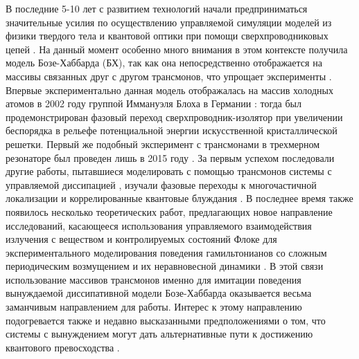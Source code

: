 \documentclass[14pt, a4paper]{extreport}
\numberwithin{equation}{section}
\begin{document}
В последние 5-10 лет с развитием технологий начали предприниматься значительные усилия по осуществлению управляемой симуляции моделей из физики твердого тела и квантовой оптики при помощи сверхпроводниковых цепей \cite{kjaergaard2020superconducting}. На данный момент особенно много внимания в этом контексте получила модель Бозе-Хаббарда (БХ), так как она непосредственно отображается на массивы связанных друг с другом трансмонов, что упрощает эксперименты \cite{orell2019probing,yanay2020two}. Впервые экспериментально данная модель отображалась на массив холодных атомов в 2002 году группой Иммануэля Блоха в Германии \cite{greiner2002quantum}: тогда был продемонстрирован фазовый переход сверхпроводник-изолятор при увеличении беспорядка в рельефе потенциальной энергии искусственной кристаллической решетки. Первый же подобный эксперимент с трансмонами в трехмерном резонаторе был проведен лишь в 2015 году \cite{hacohen2015cooling}. За первым успехом последовали другие работы, пытавшиеся моделировать с помощью трансмонов системы с управляемой диссипацией \cite{ma2019dissipatively}, изучали фазовые переходы к многочастичной локализации \cite{roushan2017spectroscopic,chiaro2019growth, collodo2019observation} и коррелированные квантовые блуждания \cite{Yan2019, Ye2019}. В последнее время также появилось несколько теоретических работ, предлагающих новое направление исследований, касающееся использования управляемого взаимодействия излучения с веществом и контролируемых состояний Флоке для экспериментального моделирования поведения гамильтонианов со сложным периодическим возмущением и их неравновесной динамики \cite{Goldman2014, eisert2015quantum, Zippilli2015, kyriienko2018floquet, franca2020simulating}. В этой связи использование массивов трансмонов именно для имитации поведения вынуждаемой диссипативной модели Бозе-Хаббарда оказывается весьма заманчивым направлением для работы. Интерес к этому направлению подогревается также и недавно высказанными предположениями о том, что системы с вынуждением могут дать альтернативные пути к достижению квантового превосходства \cite{tangpanitanon2019quantum}.
\end{document}
